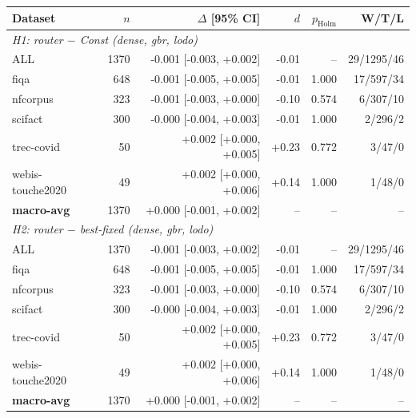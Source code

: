 \begin{tabular}{lrrrrr}
\hline
Dataset & $n$ & $\Delta$ [95\% CI] & $d$ & $p_{\mathrm{Holm}}$ & W/T/L \\
\hline
\multicolumn{6}{l}{\textit{H1: router $-$ Const (dense, gbr, lodo)}} \\
ALL & 1370 & -0.001 [-0.003, +0.002] & -0.01 & -- & 29/1295/46 \\
fiqa & 648 & -0.001 [-0.005, +0.005] & -0.01 & 1.000 & 17/597/34 \\
nfcorpus & 323 & -0.001 [-0.003, +0.000] & -0.10 & 0.574 & 6/307/10 \\
scifact & 300 & -0.000 [-0.004, +0.003] & -0.01 & 1.000 & 2/296/2 \\
trec-covid & 50 & +0.002 [+0.000, +0.005] & +0.23 & 0.772 & 3/47/0 \\
webis-touche2020 & 49 & +0.002 [+0.000, +0.006] & +0.14 & 1.000 & 1/48/0 \\
\textbf{macro-avg} & 1370 & +0.000 [-0.001, +0.002] & -- & -- & -- \\
\hline
\multicolumn{6}{l}{\textit{H2: router $-$ best-fixed (dense, gbr, lodo)}} \\
ALL & 1370 & -0.001 [-0.003, +0.002] & -0.01 & -- & 29/1295/46 \\
fiqa & 648 & -0.001 [-0.005, +0.005] & -0.01 & 1.000 & 17/597/34 \\
nfcorpus & 323 & -0.001 [-0.003, +0.000] & -0.10 & 0.574 & 6/307/10 \\
scifact & 300 & -0.000 [-0.004, +0.003] & -0.01 & 1.000 & 2/296/2 \\
trec-covid & 50 & +0.002 [+0.000, +0.005] & +0.23 & 0.772 & 3/47/0 \\
webis-touche2020 & 49 & +0.002 [+0.000, +0.006] & +0.14 & 1.000 & 1/48/0 \\
\textbf{macro-avg} & 1370 & +0.000 [-0.001, +0.002] & -- & -- & -- \\
\hline
\end{tabular}